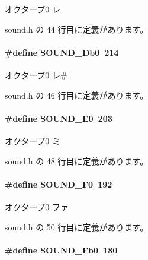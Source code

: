 オクターブ0 レ 



 sound.\+h の 44 行目に定義があります。

\paragraph[{S\+O\+U\+N\+D\+\_\+\+Db0}]{\setlength{\rightskip}{0pt plus 5cm}\#define S\+O\+U\+N\+D\+\_\+\+Db0~214}\label{sound_8h_ae54a9c279cc372bd69b65dd9d06f3210_ae54a9c279cc372bd69b65dd9d06f3210}


オクターブ0 レ\# 



 sound.\+h の 46 行目に定義があります。

\paragraph[{S\+O\+U\+N\+D\+\_\+\+E0}]{\setlength{\rightskip}{0pt plus 5cm}\#define S\+O\+U\+N\+D\+\_\+\+E0~203}\label{sound_8h_a19424f95bd658c3fb08a40b37fa18ae6_a19424f95bd658c3fb08a40b37fa18ae6}


オクターブ0 ミ 



 sound.\+h の 48 行目に定義があります。

\paragraph[{S\+O\+U\+N\+D\+\_\+\+F0}]{\setlength{\rightskip}{0pt plus 5cm}\#define S\+O\+U\+N\+D\+\_\+\+F0~192}\label{sound_8h_a9c24cc4b865b592ab72a04852c7d194e_a9c24cc4b865b592ab72a04852c7d194e}


オクターブ0 ファ 



 sound.\+h の 50 行目に定義があります。

\paragraph[{S\+O\+U\+N\+D\+\_\+\+Fb0}]{\setlength{\rightskip}{0pt plus 5cm}\#define S\+O\+U\+N\+D\+\_\+\+Fb0~180}\label{sound_8h_aaff9a7f05ba2237c933648fc79631254_aaff9a7f05ba2237c933648fc79631254}


